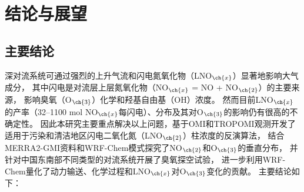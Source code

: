 
\chapter{结论与展望}

\section{主要结论}

深对流系统可通过强烈的上升气流和闪电氮氧化物（LNO$_{\ch{x}}$）显著地影响大气成分，
其中闪电是对流层上层氮氧化物（NO$_{\ch{x}}$ = NO + NO$_{\ch{2}}$）的主要来源，
影响臭氧（O$_{\ch{3}}$）化学和羟基自由基（OH）浓度。
然而目前LNO$_{\ch{x}}$的产率（32--1100 mol NO$_{\ch{x}}$每闪电）、分布及其对O$_{\ch{3}}$的影响仍有很高的不确定性。
因此本研究主要重点解决以上问题，基于OMI和TROPOMI观测开发了适用于污染和清洁地区闪电二氧化氮（LNO$_{\ch{2}}$）柱浓度的反演算法，
结合MERRA2-GMI资料和WRF-Chem模式探究了NO$_{\ch{2}}$和O$_{\ch{3}}$的垂直分布，
并针对中国东南部不同类型的对流系统开展了臭氧探空试验，
进一步利用WRF-Chem量化了动力输送、化学过程和LNO$_{\ch{x}}$对O$_{\ch{3}}$变化的贡献。
主要结论如下：

